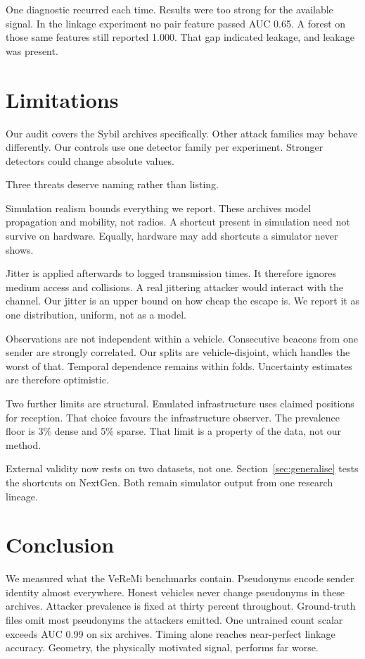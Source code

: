 \documentclass[conference]{IEEEtran}
\begin{document}
One diagnostic recurred each time.
Results were too strong for the available signal.
In the linkage experiment no pair feature passed AUC 0.65.
A forest on those same features still reported 1.000.
That gap indicated leakage, and leakage was present.

\section{Limitations}

Our audit covers the Sybil archives specifically.
Other attack families may behave differently.
Our controls use one detector family per experiment.
Stronger detectors could change absolute values.

Three threats deserve naming rather than listing.

Simulation realism bounds everything we report.
These archives model propagation and mobility, not radios.
A shortcut present in simulation need not survive on hardware.
Equally, hardware may add shortcuts a simulator never shows.

Jitter is applied afterwards to logged transmission times.
It therefore ignores medium access and collisions.
A real jittering attacker would interact with the channel.
Our jitter is an upper bound on how cheap the escape is.
We report it as one distribution, uniform, not as a model.

Observations are not independent within a vehicle.
Consecutive beacons from one sender are strongly correlated.
Our splits are vehicle-disjoint, which handles the worst of that.
Temporal dependence remains within folds.
Uncertainty estimates are therefore optimistic.

Two further limits are structural.
Emulated infrastructure uses claimed positions for reception.
That choice favours the infrastructure observer.
The prevalence floor is 3\% dense and 5\% sparse.
That limit is a property of the data, not our method.

External validity now rests on two datasets, not one.
Section~\ref{sec:generalise} tests the shortcuts on NextGen.
Both remain simulator output from one research lineage.

\section{Conclusion}

We measured what the VeReMi benchmarks contain.
Pseudonyms encode sender identity almost everywhere.
Honest vehicles never change pseudonyms in these archives.
Attacker prevalence is fixed at thirty percent throughout.
Ground-truth files omit most pseudonyms the attackers emitted.
One untrained count scalar exceeds AUC 0.99 on six archives.
Timing alone reaches near-perfect linkage accuracy.
Geometry, the physically motivated signal, performs far worse.
\end{document}
